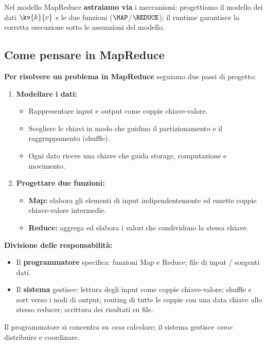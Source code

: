 Nel modello MapReduce \textbf{astraiamo via} i meccanismi: progettiamo il
modello dei dati $\kv{k}{v}$ e le due funzioni ($\MAP$/$\REDUCE$); il
runtime garantisce la corretta esecuzione sotto le assunzioni del modello.

\subsection{Come pensare in MapReduce}

\textbf{Per risolvere un problema in MapReduce} seguiamo due passi di progetto:

\begin{enumerate}
  \item \textbf{Modellare i dati:}
    \begin{itemize}
      \item Rappresentare input e output come coppie chiave-valore.
      \item Scegliere le chiavi in modo che guidino il partizionamento e il
        raggruppamento (shuffle).
      \item Ogni dato riceve una chiave che guida storage, computazione
        e movimento.
    \end{itemize}
  \item \textbf{Progettare due funzioni:}
    \begin{itemize}
      \item \textbf{Map:} elabora gli elementi di input indipendentemente
        ed emette coppie chiave-valore intermedie.
      \item \textbf{Reduce:} aggrega ed elabora i valori che condividono
        la stessa chiave.
    \end{itemize}
\end{enumerate}

\textbf{Divisione delle responsabilità:}
\begin{itemize}
  \item Il \textbf{programmatore} specifica: funzioni Map e Reduce; file di
    input / sorgenti dati.
  \item Il \textbf{sistema} gestisce: lettura degli input come coppie
    chiave-valore; shuffle e sort verso i nodi di output; routing di tutte
    le coppie con una data chiave allo stesso reducer; scrittura dei risultati
    su file.
\end{itemize}

\begin{takeaway}
  Il programmatore si concentra su \emph{cosa} calcolare; il sistema gestisce
  \emph{come} distribuire e coordinare.
\end{takeaway}

